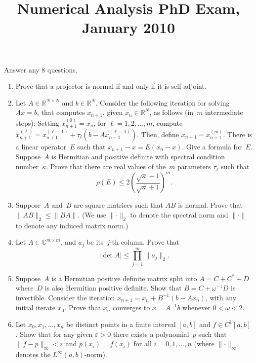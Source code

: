 \documentclass[11pt,letterpaper]{article}
\title{Numerical Analysis PhD Exam, January 2010}
\author{}
\date{}
\newenvironment{examproblems}[2]{%
  \def\ProblemHeadingTag{#2}%
  \AssignTaggingSocketPlug{block/list/label}{examproblem}%
  \begin{enumerate}%
  \setcounter{enumi}{#1}%
  \renewcommand{\labelenumi}{\textbf{\theenumi.}}%
  \setlength{\topsep}{0.35em}%
  \setlength{\partopsep}{0pt}%
  \setlength{\itemsep}{0.48em}%
  \setlength{\parsep}{0.18em}%
}{\end{enumerate}}
\newenvironment{examinstructions}{%
  \par\begingroup\itshape
}{%
  \par\endgroup\vspace{0.18em}
}
\begin{document}
\maketitle
\thispagestyle{empty}
\begin{examinstructions}
Answer any 8 questions.
\end{examinstructions}
\begin{examproblems}{0}{H2}
\def\ProblemHeadingText{Problem 1.}
\item
Prove that a projector is normal if and only if it is self-adjoint.
\def\ProblemHeadingText{Problem 2.}
\item
Let \(A \in \mathbb{R}^{N\times N}\) and \(b \in \mathbb{R}^N\). Consider the following iteration for solving \(Ax=b\), that computes \(x_{n+1}\), given \(x_n \in \mathbb{R}^N\), as follows (in~\(m\) intermediate steps): Setting \(x_{n+1}^{(0)}=x_n\), for \(\ell=1,2,\ldots,m\), compute \(x_{n+1}^{(\ell)}=x_{n+1}^{(\ell-1)}+\tau_\ell(b-Ax_{n+1}^{(\ell-1)})\). Then, define \(x_{n+1}=x_{n+1}^{(m)}\). There is a linear operator~\(E\) such that \(x_{n+1}-x=E(x_n-x)\). Give a formula for~\(E\). Suppose~\(A\) is Hermitian and positive definite with spectral condition number~\(\kappa\). Prove that there are real values of the~\(m\) parameters \(\tau_\ell\) such that
\[
\rho(E)\leq 2\left(\frac{\sqrt{\kappa}-1}{\sqrt{\kappa}+1}\right)^m.
\]
\def\ProblemHeadingText{Problem 3.}
\item
Suppose~\(A\) and~\(B\) are square matrices such that \(AB\) is normal. Prove that \(\lVert AB\rVert_2\leq \lVert BA\rVert\). (We use \(\lVert\cdot\rVert_2\) to denote the spectral norm and \(\lVert\cdot\rVert\) to denote any induced matrix norm.)
\def\ProblemHeadingText{Problem 4.}
\item
Let \(A\in\mathbb{C}^{m\times m}\), and \(a_j\) be its~\(j\)-th column. Prove that
\[
|\det A|\leq \prod_{j=1}^m\lVert a_j\rVert_2.
\]
\def\ProblemHeadingText{Problem 5.}
\item
Suppose~\(A\) is a Hermitian positive definite matrix split into \(A=C+C^*+D\) where~\(D\) is also Hermitian positive definite. Show that \(B=C+\omega^{-1}D\) is invertible. Consider the iteration \(x_{n+1}=x_n+B^{-1}(b-Ax_n)\), with any initial iterate \(x_0\). Prove that \(x_n\) converges to \(x=A^{-1}b\) whenever \(0<\omega<2\).
\def\ProblemHeadingText{Problem 6.}
\item
Let \(x_0,x_1,\ldots,x_n\) be distinct points in a finite interval \([a,b]\) and \(f\in C^1[a,b]\). Show that for any given \(\varepsilon>0\) there exists a polynomial~\(p\) such that \(\lVert f-p\rVert_\infty<\varepsilon\) and \(p(x_i)=f(x_i)\) for all \(i=0,1,\ldots,n\) (where \(\lVert\cdot\rVert_\infty\) denotes the \(L^\infty(a,b)\)-norm).

\end{examproblems}
\end{document}
